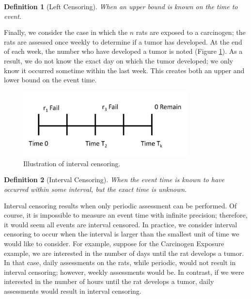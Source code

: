 \documentclass[
]{book}
\theoremstyle{plain}
\theoremstyle{mydefn}
\newtheorem{definition}{Definition}[chapter]
\theoremstyle{myexmpl}
\theoremstyle{remark}
\begin{document}
\begin{definition}[Left Censoring]
\protect\hypertarget{def:defn-left-censoring}{}{\label{def:defn-left-censoring} {} }When an \emph{upper} bound is known on the time to event.
\end{definition}

Finally, we consider the case in which the \(n\) rats are exposed to a carcinogen; the rats are assessed once weekly to determine if a tumor has developed. At the end of each week, the number who have developed a tumor is noted (Figure \ref{fig:surv-interval-censoring}). As a result, we do not know the exact day on which the tumor developed; we only know it occurred sometime within the last week. This creates both an upper and lower bound on the event time.

\begin{figure}

{\centering \includegraphics[width=0.8\textwidth]{images/censoring-interval} 

}

\caption{Illustration of interval censoring.}\label{fig:surv-interval-censoring}
\end{figure}

\begin{definition}[Interval Censoring]
\protect\hypertarget{def:defn-interval-censoring}{}{\label{def:defn-interval-censoring} {} }When the event time is known to have occurred within some interval, but the exact time is unknown.
\end{definition}

Interval censoring results when only periodic assessment can be performed. Of course, it is impossible to measure an event time with infinite precision; therefore, it would seem all events are interval censored. In practice, we consider interval censoring to occur when the interval is larger than the smallest unit of time we would like to consider. For example, suppose for the Carcinogen Exposure example, we are interested in the number of days until the rat develops a tumor. In that case, daily assessments on the rats, while periodic, would not result in interval censoring; however, weekly assessments would be. In contrast, if we were interested in the number of hours until the rat develops a tumor, daily assessments would result in interval censoring.
\end{document}
